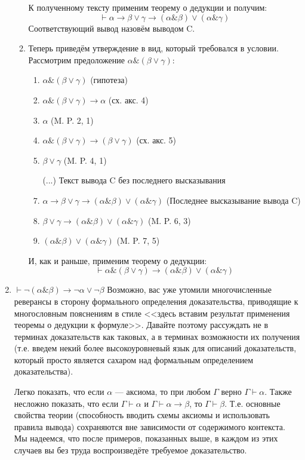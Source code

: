 \documentclass[10pt,a4paper,oneside]{article}
\begin{document}
\begin{enumerate}[label=(\alph*)]
\begin{enumerate}[label=(\Alph*)]
К полученному тексту применим теорему о дедукции и получим:
$$\vdash\alpha\rightarrow\beta\vee\gamma\rightarrow(\alpha\&\beta)\vee(\alpha\&\gamma)$$
Соответствующий вывод назовём выводом C.

\item Теперь приведём утверждение в вид, который требовался в условии. Рассмотрим предоложение
$\alpha\&(\beta\vee\gamma)$:
\begin{enumerate}[label=(\arabic*)]
\item $\alpha\&(\beta\vee\gamma)$ (гипотеза)
\item $\alpha\&(\beta\vee\gamma)\rightarrow\alpha$ (сх. акс. 4)
\item $\alpha$ (M. P. 2, 1)
\item $\alpha\&(\beta\vee\gamma)\rightarrow(\beta\vee\gamma)$ (сх. акс. 5)
\item $\beta\vee\gamma$ (M. P. 4, 1)
\item[(...)] Текст вывода C без последнего высказывания
\item $\alpha\rightarrow\beta\vee\gamma\rightarrow(\alpha\&\beta)\vee(\alpha\&\gamma)$ (Последнее высказывание вывода C)
\item $\beta\vee\gamma\rightarrow(\alpha\&\beta)\vee(\alpha\&\gamma)$ (M. P. 6, 3)
\item $(\alpha\&\beta)\vee(\alpha\&\gamma)$ (M. P. 7, 5)
\end{enumerate}
И, как и раньше, применим теорему о дедукции: 
$$\vdash\alpha\&(\beta\vee\gamma)\rightarrow(\alpha\&\beta)\vee(\alpha\&\gamma)$$
\end{enumerate}

\item $\vdash\neg(\alpha\&\beta) \rightarrow \neg\alpha\vee\neg\beta$
\newline
Возможно, вас уже утомили многочисленные реверансы в сторону формального определения
доказательства, приводящие к многословным пояснениям в стиле <<здесь вставим результат
применения теоремы о дедукции к формуле>>. Давайте поэтому рассуждать не в терминах
доказательств как таковых, а в терминах возможности их получения (т.е. введем
некий более высокоуровневый язык для описаний доказательств, который просто
является сахаром над формальным определением доказательства).

Легко показать, что если $\alpha$ --- аксиома, то при любом $\Gamma$ верно $\Gamma \vdash \alpha$.
Также несложно показать, что если $\Gamma \vdash \alpha$ и $\Gamma \vdash \alpha\rightarrow\beta$, то
$\Gamma \vdash \beta$. Т.е. основные свойства теории (способность вводить схемы
аксиомы и использовать правила вывода) сохраняются вне зависимости от
содержимого контекста. Мы надеемся, что после примеров, показанных выше, в каждом из этих случаев вы
без труда воспроизведёте требуемое доказательство. 


\end{enumerate}
\end{document}
